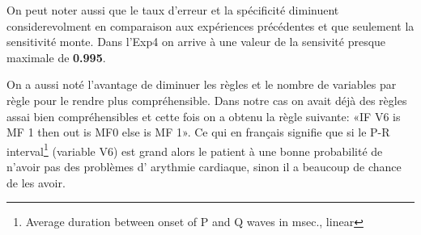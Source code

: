 On peut noter aussi que le taux d’erreur et la spécificité diminuent considerevolment en comparaison aux expériences précédentes et que seulement la sensitivité monte. Dans l'Exp4 on arrive à une valeur de la sensivité presque maximale de \textbf{0.995}.

On a aussi noté l'avantage de diminuer les règles et le nombre de variables par règle pour le rendre plus compréhensible. Dans notre cas on avait déjà des règles assai bien compréhensibles et cette fois on a obtenu la règle suivante:
«IF V6 is MF 1 then out is MF0 else is MF 1». Ce qui en français signifie que si le P-R interval\footnote{Average duration between onset of P and Q waves in msec., linear } (variable V6) est grand alors le patient à une bonne probabilité de n'avoir pas des problèmes d’ arythmie cardiaque, sinon il a beaucoup de chance de les avoir.


 
 
 
 

